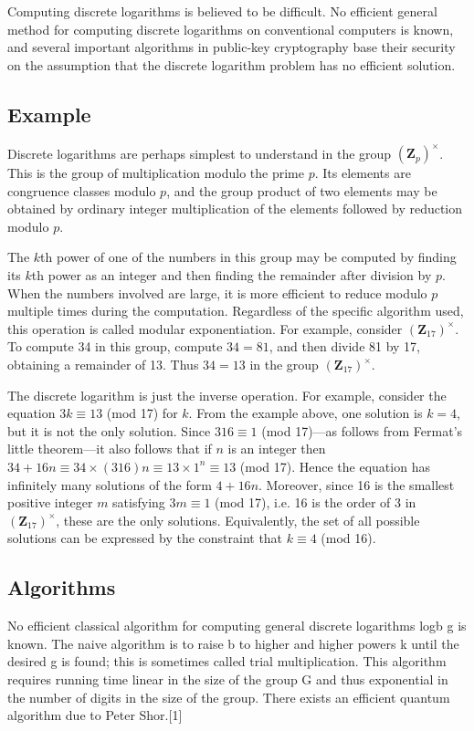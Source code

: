 \documentclass[oneside, a4paper, 11pt]{memoir}
\begin{document}
Computing discrete logarithms is believed to be difficult. No efficient general method for computing discrete logarithms on conventional computers is known, and several important algorithms in public-key cryptography base their security on the assumption that the discrete logarithm problem has no efficient solution.

\subsection{Example}
Discrete logarithms are perhaps simplest to understand in the group $(\mathbf{Z}_p)^\times$. This is the group of multiplication modulo the prime $p$. Its elements are congruence classes modulo $p$, and the group product of two elements may be obtained by ordinary integer multiplication of the elements followed by reduction modulo $p$.

The $k$th power of one of the numbers in this group may be computed by finding its $k$th power as an integer and then finding the remainder after division by $p$. When the numbers involved are large, it is more efficient to reduce modulo $p$ multiple times during the computation. Regardless of the specific algorithm used, this operation is called modular exponentiation. For example, consider $(\mathbf{Z}_{17})^\times$. To compute 34 in this group, compute $34 = 81$, and then divide 81 by 17, obtaining a remainder of 13. Thus $34 = 13$ in the group $(\mathbf{Z}_{17})^\times$.

The discrete logarithm is just the inverse operation. For example, consider the equation $3k \equiv 13$ (mod 17) for $k$. From the example above, one solution is $k = 4$, but it is not the only solution. Since $316 \equiv 1$ (mod 17)---as follows from Fermat's little theorem---it also follows that if $n$ is an integer then $34+16n \equiv 34 \times (316)n \equiv 13 \times 1^n \equiv 13$ (mod 17). Hence the equation has infinitely many solutions of the form $4 + 16n$. Moreover, since 16 is the smallest positive integer $m$ satisfying $3m \equiv 1$ (mod 17), i.e. 16 is the order of 3 in $(\mathbf{Z}_{17})^\times$, these are the only solutions. Equivalently, the set of all possible solutions can be expressed by the constraint that $k \equiv 4$ (mod 16).

\subsection{Algorithms}
No efficient classical algorithm for computing general discrete logarithms logb g is known. The naive algorithm is to raise b to higher and higher powers k until the desired g is found; this is sometimes called trial multiplication. This algorithm requires running time linear in the size of the group G and thus exponential in the number of digits in the size of the group. There exists an efficient quantum algorithm due to Peter Shor.[1]
\end{document}
